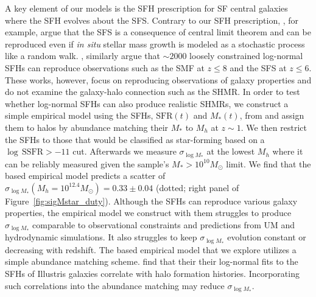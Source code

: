 \documentclass[12pt, letterpaper, preprint, tighten]{aastex62}
\newcommand{\edt}[1]{{\color{dred}{\bf} #1}}
\newcommand{\siglogm}{\sigma_{\log M_*}}
\begin{document}
A key element of our models is the SFH prescription for SF central galaxies where
the SFH evolves about the SFS. Contrary to our SFH prescription, \cite{kelson2014},
for example, argue that the SFS is a consequence of central limit theorem
and can be reproduced even if \emph{in situ} stellar mass growth is modeled as
a stochastic process like a random walk. \cite{gladders2013,abramson2015,abramson2016},
similarly argue that $\sim2000$ loosely constrained log-normal SFHs can reproduce
observations such as the SMF at $z \leq 8$ and the SFS at $z \leq 6$. These works,
however, focus on reproducing observations of galaxy properties and do not examine
the galaxy-halo connection such as the SHMR. In order to test whether log-normal
SFHs can also produce realistic SHMRs,
\edt{we construct a simple empirical model using  the SFHs, $\mathrm{SFR}(t)$ and
$M_*(t)$, from \cite{abramson2016} and assign them to halos by abundance matching
their $M_*$ to $M_h$ at $z{\sim}1$.}
We then restrict the SFHs to those that would be classified as star-forming based
on a $\log\,\mathrm{SSFR} > -11$ cut. Afterwards we measure $\siglogm$
at the lowest $M_h$ where it can be reliably measured given the \cite{abramson2016}
sample's $M_*{>}10^{10}M_\odot$ limit.
\edt{We find that the \cite{abramson2016} based empirical model predicts a scatter
of $\siglogm(M_h=10^{12.4}M_\odot) = 0.33\pm0.04$ (dotted; right panel of Figure~\ref{fig:sigMstar_duty}).
Although the \cite{abramson2016} SFHs can reproduce various galaxy properties,
the empirical model we construct with them struggles to produce $\siglogm$ comparable 
to observational constraints and predictions from UM and hydrodynamic simulations.
It also struggles to keep $\siglogm$ evolution constant or decreasing with redshift. 
The \cite{abramson2016} based empirical model that we explore utilizes a simple
abundance matching scheme. \cite{diemer2017} find that their their log-normal fits
to the SFHs of Illustris galaxies correlate with halo formation histories. Incorporating
such correlations into the abundance matching may reduce $\siglogm$.}
\end{document}
